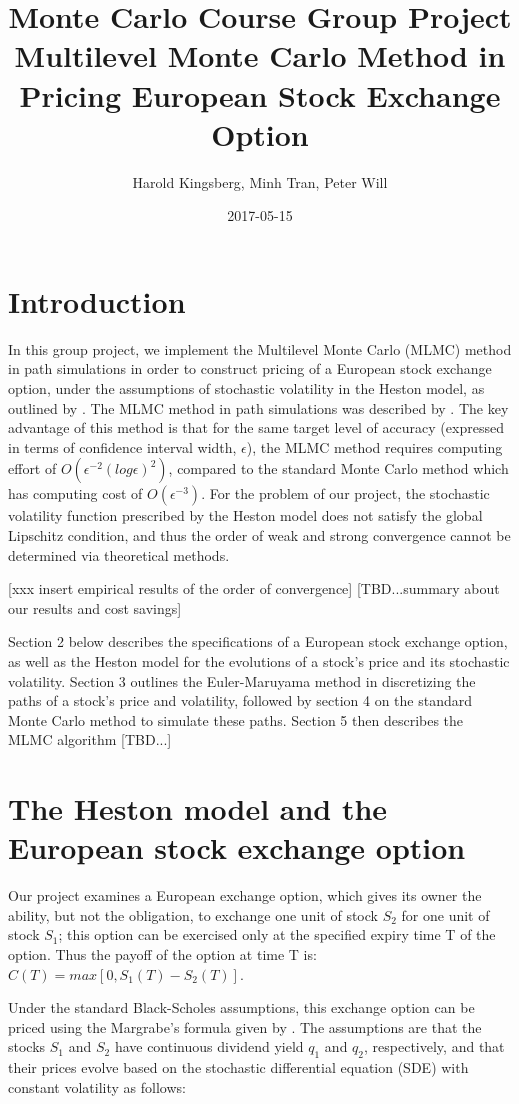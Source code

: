\documentclass{article}
\title{Monte Carlo Course Group Project \\ 
Multilevel Monte Carlo Method in Pricing European Stock Exchange Option}
\author{Harold Kingsberg, Minh Tran, Peter Will}
\date{2017-05-15}
\begin{document}
\maketitle
\tableofcontents
\newpage

\section{Introduction} 
	In this group project, we implement the Multilevel Monte Carlo (MLMC) method in path simulations in order to construct pricing of a European stock exchange option, under the assumptions of stochastic volatility in the Heston model, as outlined by \cite{heston93}. The MLMC method in path simulations was described by \cite{giles08}. The key advantage of this method is that for the same target level of accuracy (expressed in terms of confidence interval width, $\epsilon$), the MLMC method requires computing effort of $O(\epsilon^{-2}(log\epsilon)^2)$, compared to the standard Monte Carlo method which has computing cost of $O(\epsilon^{-3})$. For the problem of our project, the stochastic volatility function prescribed by the Heston model does not satisfy the global Lipschitz condition, and thus the order of weak and strong convergence cannot be determined \cite{giles08} via theoretical methods.
	
	[xxx insert empirical results of the order of convergence]
	[TBD...summary about our results and cost savings]
	
	Section 2 below describes the specifications of a European stock exchange option, as well as the Heston model for the evolutions of a stock's price and its stochastic volatility. Section 3 outlines the Euler-Maruyama method in discretizing the paths of a stock's price and volatility, followed by section 4 on the standard Monte Carlo method to simulate these paths. Section 5 then describes the MLMC algorithm [TBD...]

\section{The Heston model and the European stock exchange option}
	Our project examines a European exchange option, which gives its owner the ability, but not the obligation, to exchange one unit of stock $S_2$ for one unit of stock $S_1$; this option can be exercised only at the specified expiry time T of the option. Thus the payoff of the option at time T is: $C(T)=max[0, S_1(T)-S_2(T)]$.
	
	Under the standard Black-Scholes assumptions, this exchange option can be priced using the Margrabe's formula given by \cite{margrabe78}. The assumptions are that the stocks $S_1$ and $S_2$ have continuous dividend yield $q_1$ and $q_2$, respectively, and that their prices evolve based on the stochastic differential equation (SDE) with constant volatility as follows: 
	
\end{document}
